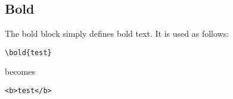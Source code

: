 \subsection{Bold}

The bold block simply defines bold text.
It is used as follows:

\begin{verbatim}
\bold{test}
\end{verbatim}

becomes
\begin{verbatim}
<b>test</b>
\end{verbatim}
